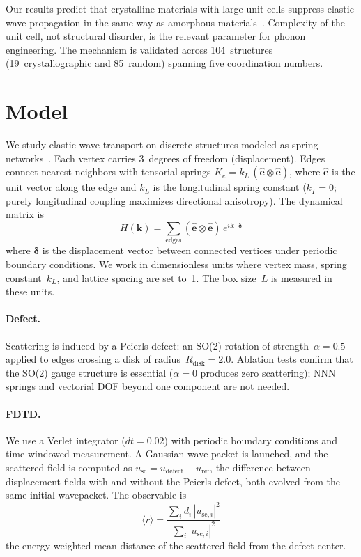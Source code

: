 \documentclass[12pt]{article}
\newcommand{\vk}{\bm{k}}
\newcommand{\ehat}{\hat{\bm{e}}}
\newcommand{\mr}{\langle r \rangle}
\begin{document}
Our results predict that crystalline materials with large unit cells suppress
elastic wave propagation in the same way as amorphous
materials~\cite{allen93,allen99}.  Complexity of the unit cell, not structural
disorder, is the relevant parameter for phonon engineering.  The mechanism is
validated across 104~structures (19~crystallographic and 85~random) spanning
five coordination numbers.

\section{Model}

We study elastic wave transport on discrete structures modeled as spring
networks~\cite{lubensky15}.  Each vertex carries 3~degrees of freedom
(displacement).  Edges connect nearest neighbors with tensorial springs
$K_e = k_L\,(\ehat \otimes \ehat)$, where $\ehat$ is the unit vector along
the edge and $k_L$ is the longitudinal spring constant ($k_T = 0$; purely
longitudinal coupling maximizes directional anisotropy).  The dynamical
matrix is
\begin{equation}\label{eq:H}
  H(\vk) = \sum_{\mathrm{edges}} (\ehat \otimes \ehat)\,
            e^{i\vk \cdot \bm{\delta}}
\end{equation}
where $\bm{\delta}$ is the displacement vector between connected vertices
under periodic boundary conditions.  We work in dimensionless units where
vertex mass, spring constant~$k_L$, and lattice spacing are set to~1.  The
box size~$L$ is measured in these units.

\paragraph{Defect.}
Scattering is induced by a Peierls defect: an SO(2) rotation of
strength~$\alpha = 0.5$ applied to edges crossing a disk of
radius~$R_{\mathrm{disk}} = 2.0$.  Ablation tests confirm that the SO(2)
gauge structure is essential ($\alpha = 0$ produces zero scattering); NNN
springs and vectorial DOF beyond one component are not needed.

\paragraph{FDTD.}
We use a Verlet integrator ($dt = 0.02$) with periodic boundary conditions
and time-windowed measurement.  A Gaussian wave packet is launched, and the
scattered field is computed as
$u_{\mathrm{sc}} = u_{\mathrm{defect}} - u_{\mathrm{ref}}$, the difference
between displacement fields with and without the Peierls defect, both evolved
from the same initial wavepacket.  The observable is
\begin{equation}\label{eq:mr}
  \mr = \frac{\sum_i d_i \,|u_{\mathrm{sc},i}|^2}
             {\sum_i |u_{\mathrm{sc},i}|^2}
\end{equation}
the energy-weighted mean distance of the scattered field from the defect
center.
\end{document}
